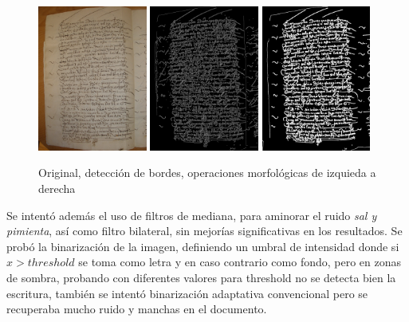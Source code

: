 \documentclass[11pt,a4paper]{article}
\begin{document}
\begin{figure}[h] \centering \begin{minipage}{1.0\textwidth} \includegraphics[width=0.32\textwidth]{CODEA-0205_2v.jpg} \includegraphics[width=0.32\textwidth]{canny_image_aftergauss_eq2.png} \includegraphics[width=0.32\textwidth]{photo_2025-01-27_21-34-01.jpg} \caption{Original, detecci\'on de bordes, operaciones morfol\'ogicas de izquieda a derecha} \label{fig:tresfotos} \end{minipage} \end{figure}

Se intent\'o adem\'as el uso de filtros de mediana, para aminorar el ruido \textit{sal y pimienta}, as\'i como filtro bilateral, sin mejor\'ias significativas en los resultados. Se probó la binarizaci\'on de la imagen, definiendo un umbral de intensidad donde si $x > threshold$ se toma como letra y en caso contrario como fondo, pero en zonas de sombra, probando con diferentes valores para threshold no se detecta bien la escritura, tambi\'en se intentó binarizaci\'on adaptativa convencional pero se recuperaba mucho ruido y manchas en el documento.\\
\end{document}
